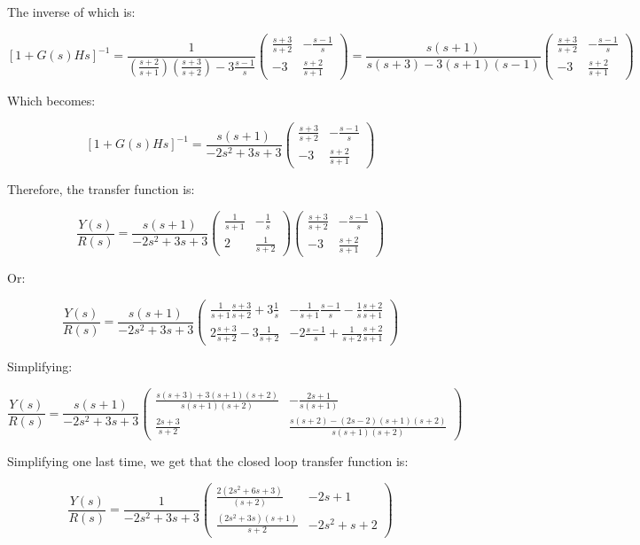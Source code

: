 \documentclass[12pt, letterpaper]{../assignment}
\begin{document}
The inverse of which is:

$$ [1 + G(s)H{s}]^{-1} = \frac{1}{(\frac{s+2}{s+1})(\frac{s+3}{s+2}) - 3\frac{s-1}{s} } \left(\begin{array}{cc} \frac{s+3}{s+2} & -\frac{s-1}{s}\\ -3 & \frac{s+2}{s+1}  \end{array}\right)
= \frac{s(s+1)}{s(s+3)-3(s+1)(s-1)}  \left(\begin{array}{cc} \frac{s+3}{s+2} & -\frac{s-1}{s}\\ -3 & \frac{s+2}{s+1}  \end{array}\right) $$

Which becomes:

$$ [1 + G(s)H{s}]^{-1} 
= \frac{s(s+1)}{- 2 s^2 + 3 s + 3}  \left(\begin{array}{cc} \frac{s+3}{s+2} & -\frac{s-1}{s}\\ -3 & \frac{s+2}{s+1}  \end{array}\right) $$

Therefore, the transfer function is:

$$ \frac{Y(s)}{R(s)}
= \frac{s(s+1)}{- 2 s^2 + 3 s + 3} \left(\begin{array}{cc} \frac{1}{s+1} & -\frac{1}{s}\\ 2 & \frac{1}{s+2} \end{array}\right)  \left(\begin{array}{cc} \frac{s+3}{s+2} & -\frac{s-1}{s}\\ -3 & \frac{s+2}{s+1}  \end{array}\right) $$

Or:

$$ \frac{Y(s)}{R(s)}
= \frac{s(s+1)}{- 2 s^2 + 3 s + 3} \left(\begin{array}{cc} \frac{1}{s+1}\frac{s+3}{s+2} +3\frac{1}{s} & -\frac{1}{s+1}\frac{s-1}{s} -\frac{1}{s}\frac{s+2}{s+1}\\ 2\frac{s+3}{s+2} -3\frac{1}{s+2} & -2\frac{s-1}{s} + \frac{1}{s+2}\frac{s+2}{s+1} \end{array}\right)  $$

Simplifying:

$$ \frac{Y(s)}{R(s)}
= \frac{s(s+1)}{- 2 s^2 + 3 s + 3} \left(\begin{array}{cc} \frac{s(s+3)+3(s+1)(s+2)}{s(s+1)(s+2)}  & -\frac{2s+1}{s(s+1)} \\ \frac{2s+3}{s+2} & \frac{s(s+2)-(2s-2)(s+1)(s+2)}{s(s+1)(s+2)}  \end{array}\right)  $$

Simplifying one last time, we get that the closed loop transfer function is:

\begin{answer}
$$ \frac{Y(s)}{R(s)}
= \frac{1}{- 2 s^2 + 3 s + 3} \left(\begin{array}{cc} \frac{2(2 s^2 + 6s + 3)}{(s+2)}  & -2s+1 \\ \frac{(2s^2+3s)(s+1)}{s+2} & - 2 s^2 + s + 2  \end{array}\right)  $$
\end{answer}
\end{document}
